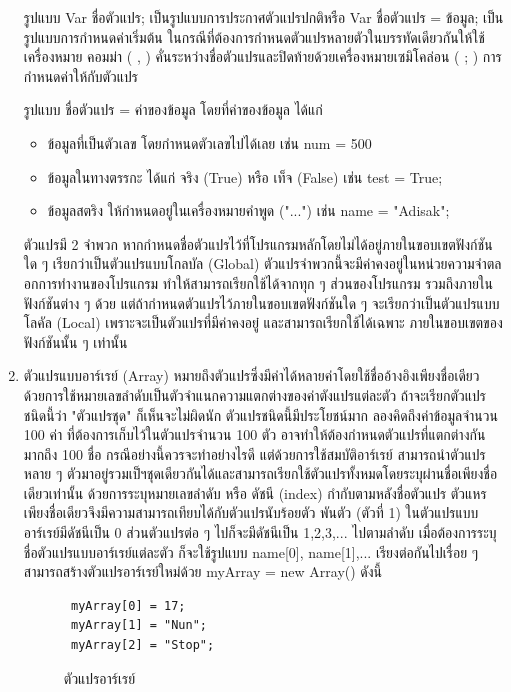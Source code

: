 \begin{enumerate}
		 รูปแบบ
		 Var ชื่อตัวแปร;
		 เป็นรูปแบบการประกาศตัวแปรปกติหรือ Var ชื่อตัวแปร = ข้อมูล; เป็นรูปแบบการกำหนดค่าเริ่มต้น
		 ในกรณีที่ต้องการกำหนดตัวแปรหลายตัวในบรรทัดเดียวกันให้ใช้เครื่องหมาย คอมม่า ( , ) คั่นระหว่างชื่อตัวแปรและปิดท้ายด้วยเครื่องหมายเซมิโคล่อน ( ; )
		 การกำหนดค่าให้กับตัวแปร
		 
		 รูปแบบ
		 ชื่อตัวแปร = ค่าของข้อมูล
		 โดยที่ค่าของข้อมูล ได้แก่
		 \begin{itemize}
		 	\item ข้อมูลที่เป็นตัวเลข โดยกำหนดตัวเลขไปได้เลย เช่น num = 500
		 	\item ข้อมูลในทางตรรกะ ได้แก่ จริง (True) หรือ เท็จ (False) เช่น test = True; 
		 	\item ข้อมูลสตริง ให้กำหนดอยู่ในเครื่องหมายคำพูด ("...") เช่น name = "Adisak";
		 \end{itemize}
		 ตัวแปรมี 2 จำพวก หากกำหนดชื่อตัวแปรไว้ที่โปรแกรมหลักโดยไม่ได้อยู่ภายในขอบเขตฟังก์ชันใด ๆ เรียกว่าเป็นตัวแปรแบบโกลบัล (Global) ตัวแปรจำพวกนี้จะมีค่าคงอยู่ในหน่วยความจำตลอกการทำงานของโปรแกรม ทำให้สามารถเรียกใช้ได้จากทุก ๆ ส่วนของโปรแกรม รวมถึงภายในฟังก์ชันต่าง ๆ ด้วย
		 แต่ถ้ากำหนดตัวแปรไว้ภายในขอบเขตฟังก์ชันใด ๆ จะเรียกว่าเป็นตัวแปรแบบ โลคัล (Local) เพราะจะเป็นตัวแปรที่มีค่าคงอยู๋ และสามารถเรียกใช้ได้เฉพาะ ภายในขอบเขตของฟังก์ชันนั้น ๆ เท่านั้น 
		 
		 \item ตัวแปรแบบอาร์เรย์ (Array) หมายถึงตัวแปรซึ่งมีค่าได้หลายค่าโดยใช้ชื่ออ้างอิงเพียงชื่อเดียว ด้วยการใช้หมายเลขลำดับเป็นตัวจำแนกความแตกต่างของค่าตังแปรแต่ละตัว ถ้าจะเรียกตัวแปรชนิดนี้ว่า "ตัวแปรชุด" ก็เห็นจะไม่ผิดนัก ตัวแปรชนิดนี้มีประโยชน์มาก ลองคิดถึงค่าข้อมูลจำนวน 100 ค่า ที่ต้องการเก็บไว้ในตัวแปรจำนวน 100 ตัว อาจทำให้ต้องกำหนดตัวแปรที่แตกต่างกันมากถึง 100 ชื่อ กรณีอย่างนี้ควรจะทำอย่างไรดี แต่ด้วยการใช้สมบัติอาร์เรย์ สามารถนำตัวแปรหลาย ๆ ตัวมาอยู่รวมเป็ฯชุดเดียวกันได้และสามารถเรียกใช้ตัวแปรทั้งหมดโดยระบุผ่านชื่อเพียงชื่อเดียวเท่านั้น ด้วยการระบุหมายเลขลำดับ หรือ ดัชนี (index) กำกับตามหลังชื่อตัวแปร ตัวแหรเพียงชื่อเดียวจึงมีความสามารถเทียบได้กับตัวแปรนับร้อยตัว พันตัว (ตัวที่ 1) ในตัวแปรแบบอาร์เรย์มีดัชนีเป็น 0 ส่วนตัวแปรต่อ ๆ ไปก็จะมีดัชนีเป็น 1,2,3,... ไปตามลำดับ เมื่อต้องการระบุชื่อตัวแปรแบบอาร์เรย์แต่ละตัว ก็จะใช้รูปแบบ name[0], name[1],... เรียงต่อกันไปเรื่อย ๆ สามารถสร้างตัวแปรอาร์เรย์ใหม่ด้วย myArray = new Array() ดังนี้
		 			\begin{figure}[H]
		 				{\begin{lstlisting}
 myArray[0] = 17;
 myArray[1] = "Nun";
 myArray[2] = "Stop";
		 					\end{lstlisting}}
		 				\caption{ตัวแปรอาร์เรย์}
		 				\label{Fig:ตัวแปรอาร์เรย์}
		 			\end{figure}	


\end{enumerate}
